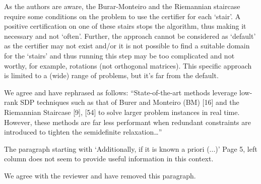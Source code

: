 As the authors are aware, the Burar-Monteiro and the Riemannian staircase require some conditions on the problem to use the certifier for each ‘stair’. A positive certification on one of these stairs stops the algorithm, thus making it necessary and not `often'. Further, the approach cannot be considered as `default' as the certifier may not exist and/or it is not possible to find a suitable domain for the ‘stairs’ and thus running this step may be too complicated and not worthy, for example, rotations (not orthogonal matrices). This specific approach is limited to a (wide) range of problems, but it’s far from the default.  
\begin{response}
    We agree and have rephrased as follows: ``State-of-the-art methods leverage low-rank SDP techniques such as that of Burer and Monteiro (BM) [16] and
    the Riemannian Staircase [9], [54] to solve larger problem
    instances in real time. However, these methods are far less performant when redundant constraints are introduced to tighten the semidefinite
    relaxation\ldots''
\end{response}

The paragraph starting with ‘Additionally, if it is known a priori (...)’ Page 5, left column does not seem to provide useful information in this context.  
\begin{response}
    We agree with the reviewer and have removed this paragraph.
\end{response}


